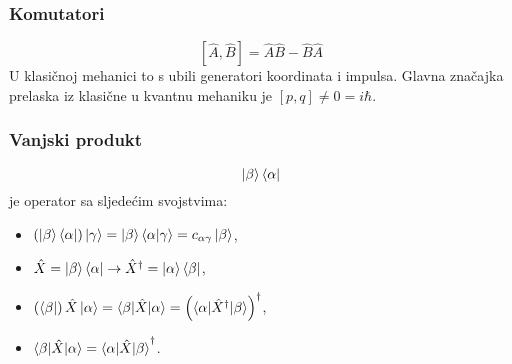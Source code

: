 \documentclass{article}
\numberwithin{equation}{section}
\begin{document}
\subsubsection{Komutatori}
\begin{equation}
	\left[\hat{A},\hat{B}\right] = \hat{A} \hat{B} - \hat{B}\hat{A}
\end{equation}
U klasičnoj mehanici to s ubili generatori koordinata i impulsa. Glavna značajka prelaska iz klasične u kvantnu mehaniku je $\left[p,q\right]\ne0=i\hbar$.
\subsubsection{Vanjski produkt}
\begin{equation}
	\ket{\beta}\bra{\alpha}
\end{equation}
je operator sa sljedećim svojstvima:
\begin{itemize}
	\item $\left(\ket{\beta}\bra{\alpha}\right)\ket{\gamma} = \ket{\beta}\braket{\alpha|\gamma} = c_{\alpha\gamma}\ket{\beta}$,
	\item $\hat{X} = \ket{\beta}\bra{\alpha} \rightarrow \hat{X}^{\dagger} = \ket{\alpha}\bra{\beta}$,
	\item $\left(\bra{\beta}\right)\hat{X}\ket{\alpha} = \braket{\beta|\hat{X}|\alpha} = \left(\braket{\alpha|\hat{X}^{\dagger}|\beta}\right)^{\dagger}$,
	\item $\braket{\beta|\hat{X}|\alpha} = \braket{\alpha|\hat{X}|\beta}^{\dagger}$.
\end{itemize}
\end{document}
